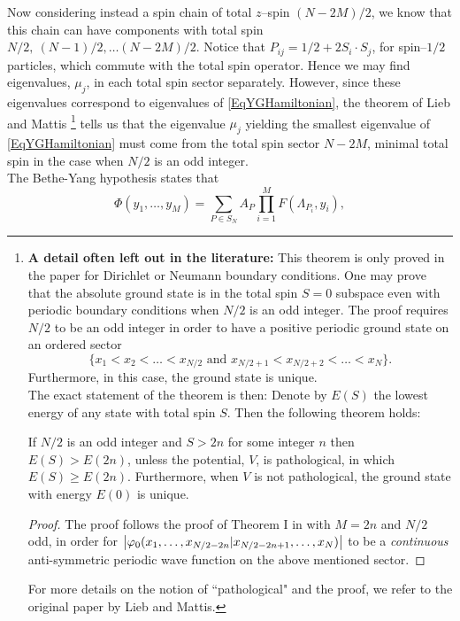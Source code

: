 Now considering instead a spin chain of total $ z $--spin $ (N-2M)/2 $, we know that this chain can have components with total spin $ N/2,\ (N-1)/2,\ldots (N-2M)/2 $. Notice that $ P_{ij}=1/2+2S_i\cdot S_j $, for spin--$ 1/2 $ particles, which commute with the total spin operator. Hence we may find eigenvalues, $ \mu_j $, in each total spin sector separately. However, since these eigenvalues correspond to eigenvalues of \eqref{EqYGHamiltonian}, the theorem of Lieb and Mattis \cite{lieb1962theory}\footnote{\textbf{A detail often left out in the literature:} This theorem is only proved in the paper \cite{lieb1962theory} for Dirichlet or Neumann boundary conditions. One may prove that the absolute ground state is in the total spin $ S=0 $ subspace even with periodic boundary conditions when $ N/2 $ is an odd integer. The proof requires $ N/2 $ to be an odd integer in order to have a positive periodic ground state on an ordered sector $$ \{x_1<x_2<\ldots<x_{N/2}\text{ and } x_{N/2+1}<x_{N/2+2}<\ldots<x_N\}. $$
Furthermore, in this case, the ground state is unique.\\
The exact statement of the theorem is then: Denote by $ E(S) $ the lowest energy of any state with total spin $ S $. Then the following theorem holds:
\begin{theorem}[Lieb and Mattis, \cite{lieb1962theory}, for periodic boundary conditions, $ d=1 $]\label{TheoremLiebMattis}
	If $ N/2 $ is an odd integer and $ S>2n $ for some integer $ n $ then $ E(S)> E(2n) $, unless the potential, $ V $, is pathological, in which $ E(S)\geq E(2n) $. Furthermore, when $ V $ is not pathological, the ground state with energy $ E(0) $ is unique.
\end{theorem}
\begin{proof}
	The proof follows the proof of Theorem I in \cite{lieb1962theory} with $ M=2n $ and $ N/2 $ odd, in order for $ \left\lvert \varphi_0(x_1,\ldots,x_{N/2-2n}\vert x_{N/2-2n+1},\ldots,x_N) \right\rvert $ to be a \emph{continuous} anti-symmetric periodic wave function on the above mentioned sector.
\end{proof}
For more details on the notion of ``pathological" and the proof, we refer to the original paper by Lieb and Mattis.} tells us that the eigenvalue $ \mu_j $ yielding the smallest eigenvalue of \eqref{EqYGHamiltonian} must come from the total spin sector $ N-2M $, \ie minimal total spin in the case when $ N/2 $ is an odd integer.\\
The Bethe-Yang hypothesis states that \begin{equation}\label{EqBetheYangHypothesis}
\Phi(y_1,\ldots,y_M)=\sum_{P\in S_{N}}A_P \prod_{i=1}^{M}F(\Lambda_{P_i},y_i),
\end{equation}
